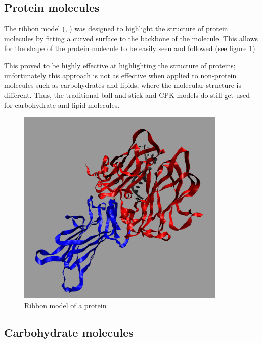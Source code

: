 
\subsection{Protein molecules}
\label{sub:background_protein}

The ribbon model (\citep{richardson81}, \citep{carson87}) was designed to
highlight the structure of protein molecules by fitting a curved surface to the
backbone of the molecule. This allows for the shape of the protein molecule to
be easily seen and followed (see figure \ref{fig:background_ribbon}).

This proved to be highly effective at highlighting the structure of proteins;
unfortunately this approach is not as effective when applied to non-protein
molecules such as carbohydrates and lipids, where the molecular structure is
different. Thus, the traditional ball-and-stick and CPK models do still get
used for carbohydrate and lipid molecules.

\begin{figure}[h!]
  \begin{center}
    \includegraphics[width=100mm]{ribbon}
  \end{center}
  \caption{Ribbon model of a protein}
  \label{fig:background_ribbon}
\end{figure}


\subsection{Carbohydrate molecules}
\label{sub:background_carbohydrate}

